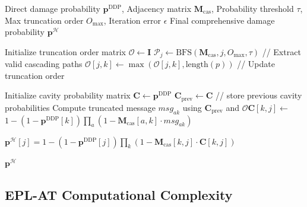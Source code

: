 \documentclass[lettersize,journal]{IEEEtran}
\begin{document}
\begin{algorithm}[H]
\caption{EPL-AT Strategy}\label{alg:EPL_AT_Strategy}
\begin{algorithmic}[1]
\renewcommand{\algorithmicrequire}{\textbf{Input:}}
\renewcommand{\algorithmicensure}{\textbf{Output:}}
\REQUIRE Direct damage probability $\boldsymbol{p}^{\text{DDP}}$, Adjacency matrix $\mathbf{M}_{\text{cas}}$, Probability threshold $\tau$, Max truncation order $O_{\text{max}}$, Iteration error $\epsilon$
\ENSURE Final comprehensive damage probability $\boldsymbol{p}^{\mathcal{H}}$

\STATE Initialize truncation order matrix $\boldsymbol{\mathcal{O}} \gets \boldsymbol{I}$
    \STATE $\mathcal{P}_{j} \gets \text{BFS}(\mathbf{M}_{\text{cas}}, j, O_{\text{max}}, \tau)$ // Extract valid cascading paths
        \STATE $\boldsymbol{\mathcal{O}}[j,k] \gets \max(\boldsymbol{\mathcal{O}}[j,k], \text{length}(p))$  // Update truncation order
    \ENDFOR
\ENDFOR

\STATE Initialize cavity probability matrix $\boldsymbol{C} \gets \boldsymbol{p}^{\text{DDP}}$
\REPEAT
    \STATE $\boldsymbol{C}_{\text{prev}} \gets \boldsymbol{C}$ // store previous cavity probabilities
        \STATE Compute truncated message $msg_{ak}$ using $\boldsymbol{C}_{\text{prev}}$ and $\boldsymbol{\mathcal{O}}
        $\STATE $\boldsymbol{C}[k,j] \gets $ \\
        $1 - (1 - \boldsymbol{p}^{\text{DDP}}[k]) \prod_{a} \left(1 - \mathbf{M}_{\text{cas}}[a,k] \cdot msg_{ak} \right)$
    \ENDFOR
{}

    \STATE $\boldsymbol{p}^{\mathcal{H}}[j] = 1 - (1 - \boldsymbol{p}^{\text{DDP}}[j]) \prod_{k} \left(1 - \mathbf{M}_{\text{cas}}[k,j] \cdot \boldsymbol{C}[k,j]\right)$
\ENDFOR

\RETURN $\boldsymbol{p}^{\mathcal{H}}$
\end{algorithmic}
\end{algorithm}


\subsection{EPL-AT Computational Complexity}
\end{document}
